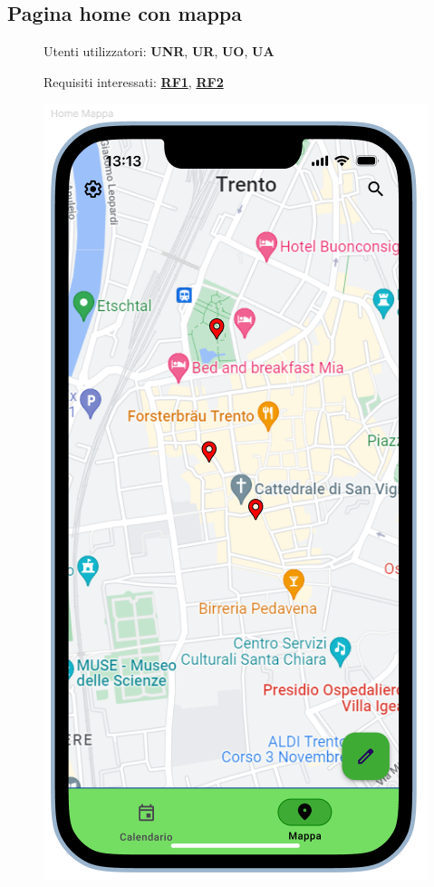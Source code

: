 \documentclass{article}
\begin{document}
\subsection{Pagina home con mappa}
\begin{description}
    \item[] Utenti utilizzatori: \textbf{UNR}, \textbf{UR}, \textbf{UO}, \textbf{UA}
    \item[] Requisiti interessati: \hyperref[rf_1]{\textbf{RF1}}, \hyperref[rf_2]{\textbf{RF2}}
    \item[] \begin{center}
            \includegraphics[scale=0.6]{Home_Mappa.png}

\end{center}
\end{description}
\end{document}
